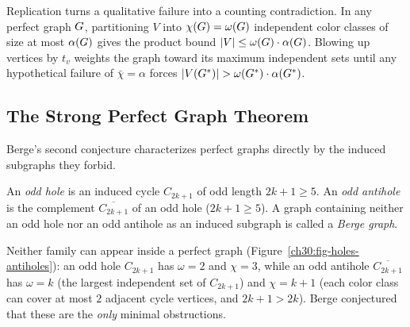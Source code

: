 \begin{whybox}
Replication turns a qualitative failure into a counting contradiction. In any perfect graph $G$, partitioning $V$ into $\chi(G)=\omega(G)$ independent color classes of size at most $\alpha(G)$ gives the product bound $\lvert V\rvert\le\omega(G)\cdot\alpha(G)$. Blowing up vertices by $t_v$ weights the graph toward its maximum independent sets until any hypothetical failure of $\bar\chi=\alpha$ forces $\lvert V(G^\ast)\rvert>\omega(G^\ast)\cdot\alpha(G^\ast)$.
\end{whybox}

\subsection*{The Strong Perfect Graph Theorem}

Berge's second conjecture characterizes perfect graphs directly by the induced subgraphs they forbid.

\begin{definition}\label{ch30:def-holes}
An \emph{odd hole} is an induced cycle $C_{2k+1}$ of odd length $2k+1\ge 5$. An \emph{odd antihole} is the complement $\overline{C_{2k+1}}$ of an odd hole ($2k+1\ge 5$). A graph containing neither an odd hole nor an odd antihole as an induced subgraph is called a \emph{Berge graph}.
\end{definition}

Neither family can appear inside a perfect graph (Figure~\ref{ch30:fig-holes-antiholes}): an odd hole $C_{2k+1}$ has $\omega=2$ and $\chi=3$, while an odd antihole $\overline{C_{2k+1}}$ has $\omega=k$ (the largest independent set of $C_{2k+1}$) and $\chi=k+1$ (each color class can cover at most $2$ adjacent cycle vertices, and $2k+1>2k$). Berge conjectured that these are the \emph{only} minimal obstructions.

